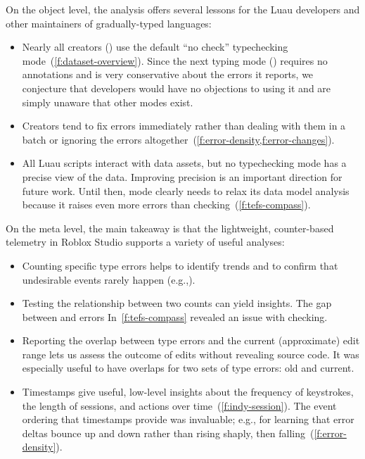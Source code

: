 \documentclass[english,submission,cleveref]{programming}
\begin{document}
On the object level, the analysis offers several lessons for the Luau
developers and other maintainers of gradually-typed languages:
\begin{itemize}
  \item
    Nearly all creators () use the default ``no check''
    typechecking mode~(\cref{f:dataset-overview}).
    Since the next typing mode (\mnonstrict{}) requires no annotations and is
    very conservative about the errors it reports, we conjecture that
    developers would have no objections to using it and are simply unaware that
    other modes exist.
  \item
    Creators tend to fix errors immediately rather than dealing with them in a batch
    or ignoring the errors altogether~(\cref{f:error-density,f:error-changes}).
  \item
    All Luau scripts interact with data assets, but no typechecking mode
    has a precise view of the data.
    Improving precision is an important direction for future work.
    Until then, \mstrict{} mode clearly needs to relax its data model
    analysis because it raises even more errors than \FS{} checking~(\cref{f:tefs-compass}).
\end{itemize}


On the meta level, the main takeaway is that the lightweight, counter-based telemetry
in Roblox Studio supports a variety of useful analyses:
\begin{itemize}
  \item
    Counting specific type errors helps to identify trends and to confirm that
    undesirable events rarely happen (e.g.,).
  \item
    Testing the relationship between two counts can yield insights.
    The gap between \mstrict{} and \FS{} errors In~\cref{f:tefs-compass}
    revealed an issue with \mstrict{} checking.
  \item
    Reporting the overlap between type errors and the current (approximate) edit
    range lets us assess the outcome of edits without revealing source code.
    It was especially useful to have overlaps for two sets of type errors: old and current.
  \item
    Timestamps give useful, low-level insights about the frequency of keystrokes,
    the length of sessions, and actions over time~(\cref{f:indy-session}).
    The event ordering that timestamps provide was invaluable; e.g., for learning
    that error deltas bounce up and down rather than rising shaply, then falling~(\cref{f:error-density}).
\end{itemize}
\end{document}
